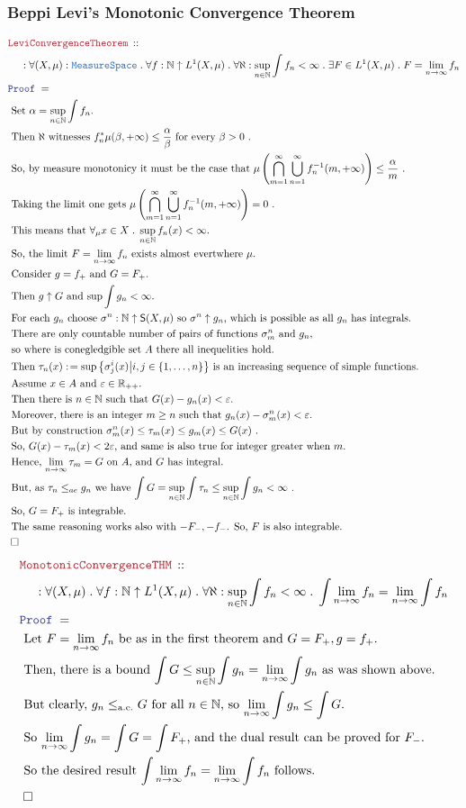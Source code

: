 \documentclass[12pt]{scrartcl}
\newcommand{\TYPE}[1]{\textcolor{NavyBlue}{\mathtt{#1}}}
\newcommand{\LOGIC}[1]{\textcolor{Blue}{\mathtt{#1}}}
\newcommand{\THM}[1]{\textcolor{Maroon}{\mathtt{#1}}}
\renewcommand{\.}{\; . \;}
\newcommand{\de}{: \kern 0.1pc =}
\newcommand{\Theorem}[2]{& \THM{#1} \, :: \, #2 \\ & \Proof = \\ }
\newcommand{\NewLine}{\\ & \kern 1pc}
\newcommand{\Page}[1]{ \begin{align*} #1 \end{align*}   }
\newcommand{\Reals}{\mathbb{R} }
\newcommand{\Nat}{\mathbb{N} }
\newcommand{\QED}{\; \square}
\newcommand{\EndProof}{& \QED \\}
\newcommand{\Proof}{\LOGIC{Proof} \; }
\newcommand{\Explain}[1]{& \text{#1.} \\}
\newcommand{\ExplainFurther}[1]{& \text{#1} \\}
\newcommand{\MS}{\TYPE{MeasureSpace}}
\renewcommand{\ae}{\mathrm{a.e.}}
\newcommand{\Simple}{\mathsf{S}}
\begin{document}
\subsubsection{Beppi Levi's Monotonic Convergence Theorem}
\Page{
	\Theorem{
		LeviConvergenceTheorem
	}{
		\NewLine :		
		\forall (X,\mu) : \MS \.
		\forall f : \Nat \uparrow L^1(X,\mu) \. 
		\forall \aleph : \sup_{n \in \Nat} \int f_n < \infty \.
		\exists F \in L^1(X,\mu)  \. F = \lim_{n \to \infty} f_n 
	}
	\Explain{
		Set $\alpha = \sup_{n \in \Nat} \int f_n$}
	\Explain{
			Then $\aleph$ witnesses $f^*_n\mu(\beta,+\infty) \le \frac{\alpha}{\beta} $ for every $\beta > 0$
	}
	\Explain{
	 	So, by measure monotonicy it must be the case that 
	 	$\mu\left( \bigcap^\infty_{m=1}\bigcup^\infty_{n=1} f_n^{-1}(m,+\infty)\right) 
	 	\le \frac{\alpha}{m} $ }
	\Explain{
		Taking the limit one gets
		$
			\mu\left( \bigcap^\infty_{m=1}\bigcup^\infty_{n=1} f_n^{-1}(m,+\infty)\right)  = 0
		$
	}
	\Explain{
		This means that $\forall_\mu x \in X \. \sup_{n \in \Nat} f_n(x) < \infty$}
	\Explain{ 
		So, the limit $F = \lim_{n \to \infty} f_n$ exists almost evertwhere $\mu$}
	\Explain{
		Consider $g = f_+$ and $G = F_+$}
	\Explain{
		Then $g \uparrow G$ and $\sup \int g_n < \infty$}
	\Explain{ For each $g_n$ choose $\sigma^n: \Nat \uparrow \Simple(X,\mu)$ so 
				$\sigma^n \uparrow g_n$, which is possible as all $g_n$ has integrals}
	\ExplainFurther{
		There are  only countable number of pairs of functions $\sigma^n_m$ and $g_n$,}
	\Explain{
		so where is conegledgible set $A$ there all inequelities hold}
	\Explain{ Then $\tau_n(x) \de \sup \big\{ \sigma^i_j(x) \big| i,j \in \{1,\ldots,n \}\big\}$ 
	is an increasing sequence of simple functions} 
	\Explain{
		Assume  $x \in A$ and  $\varepsilon \in \Reals_{++}$}
	\Explain{
		Then there is $n \in \Nat$ such that $G(x) - g_n(x) < \varepsilon$}
	\Explain{
		Moreover, there is an integer $m \ge n$ such that $g_n(x) - \sigma^n_m(x) < \varepsilon$}
	\Explain{
		But by construction $\sigma^n_m(x) \le \tau_m(x) \le g_m(x) \le G(x)$
	}
	\Explain{
		So, $G(x) - \tau_m(x) < 2\varepsilon$, and same is also true for integer greater when $m$}
	\Explain{
		Hence, $\lim_{n \to \infty} \tau_m = G$ on $A$, and $G$ has integral}
	\Explain{
	But, as $\tau_n \le_{ae} g_n$ we have 
	$\int G = \sup_{n \in \Nat}\int \tau_n \le \sup_{n\in \Nat}\int g_n < \infty$ }
	\Explain{
		So, $G=F_+$ is integrable}
	\Explain{
		The same reasoning  works also with $-F_-,-f_-$. So, $F$ is also integrable}
	\EndProof
}\Page{
	\Theorem{
		MonotonicConvergenceTHM
	}{
		\NewLine :		
		\forall (X,\mu) \.
		\forall f : \Nat \uparrow L^1(X,\mu) \. 
		\forall \aleph : \sup_{n \in \Nat} \int f_n < \infty \.
		\int \lim_{n \to \infty} f_n  = \lim_{n \to \infty} \int f_n
	}
	\Explain{ Let $F = \lim_{n \to \infty} f_n$ be as in the first theorem  and 
		$G = F_+, g = f_+$}
	\Explain{ 
		Then, there is a bound $\int G \le \sup_{n\in \Nat}\int g_n = \lim_{n \to \infty} \int g_n$
		as was shown above}
	\Explain{ 
		But clearly, $g_n \le_{\ae} G$ for all $n \in \Nat$, so $\lim_{n \to \infty} \int g_n \le \int G$}
	\Explain{ 
		So $\lim_{n\to \infty} \int g_n = \int G = \int F_+$, and the dual result can be proved for $F_-$}
	\Explain{
		So the desired result $\int \lim_{n \to \infty} f_n  = \lim_{n \to \infty} \int f_n$ follows}	
	\EndProof
}
\newpage
\end{document}
